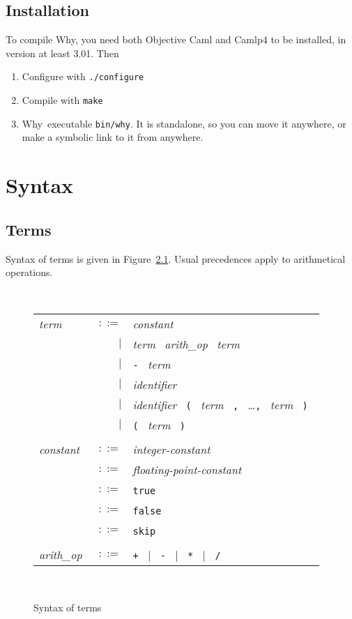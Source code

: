\documentclass[a4paper,12pt]{report}
\newcommand{\why}{\textsf{Why}}
\newcommand{\te}[1]{\texttt{#1}~}
\newcommand{\nt}[1]{\textsl{#1}~}
\begin{document}
\section{Installation}

To compile \why, you need both \textsf{Objective Caml} and
\textsf{Camlp4} to be installed, in version at least 3.01.
Then 

\begin{enumerate}
\item Configure with \texttt{./configure}
\item Compile with \texttt{make}
\item \why\ executable \texttt{bin/why}. It is standalone, 
  so you can move it anywhere, or make a symbolic link to it from anywhere.
\end{enumerate}


\chapter{Syntax}
\label{syntax}

\section{Terms}

Syntax of terms is given in Figure~\ref{fig:terms}.
Usual precedences apply to arithmetical operations.

\begin{figure}[htbp]
\begin{center}
\hrulefill\\
\begin{tabular}{lrl}
  \nt{term}
    & $::=$ & \nt{constant} \\
      & $|$ & \nt{term} \nt{arith\_op} \nt{term} \\
      & $|$ & \te{-} \nt{term} \\
      & $|$ & \nt{identifier} \\
      & $|$ & \nt{identifier} 
              \te{(} \nt{term} \te{,} \dots \te{,} \nt{term} \te{)} \\
      & $|$ & \te{(} \nt{term} \te{)} \\
  \\[0.1em]

  \nt{constant}
    & $::=$ & \nt{integer-constant} \\
    & $::=$ & \nt{floating-point-constant} \\
    & $::=$ & \te{true} \\
    & $::=$ & \te{false} \\
    & $::=$ & \te{skip} \\
  \\[0.1em]

  \nt{arith\_op}
    & $::=$ & \te{+} $|$~ \te{-} $|$~ \te{*} $|$~ \te{/}
\end{tabular}\\
\hrulefill
\caption{Syntax of terms}
\label{fig:terms}
\end{center}            
\end{figure}
\end{document}
